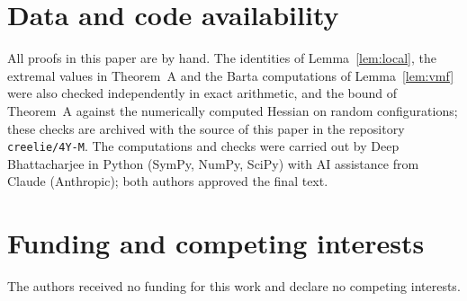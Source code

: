 \documentclass[11pt]{amsart}
\theoremstyle{definition}
\theoremstyle{remark}
\begin{document}
\section*{Data and code availability}

All proofs in this paper are by hand. The identities of
Lemma~\ref{lem:local}, the extremal values in Theorem~A and the Barta
computations of Lemma~\ref{lem:vmf} were also checked independently in exact
arithmetic, and the bound of Theorem~A against the numerically computed
Hessian on random configurations; these checks are archived with the source of
this paper in the repository \texttt{creelie/4Y-M}. The computations and checks
were carried out by Deep Bhattacharjee in Python (SymPy, NumPy, SciPy) with AI
assistance from Claude (Anthropic); both authors approved the final text.

\section*{Funding and competing interests}

The authors received no funding for this work and declare no competing
interests.
\end{document}
